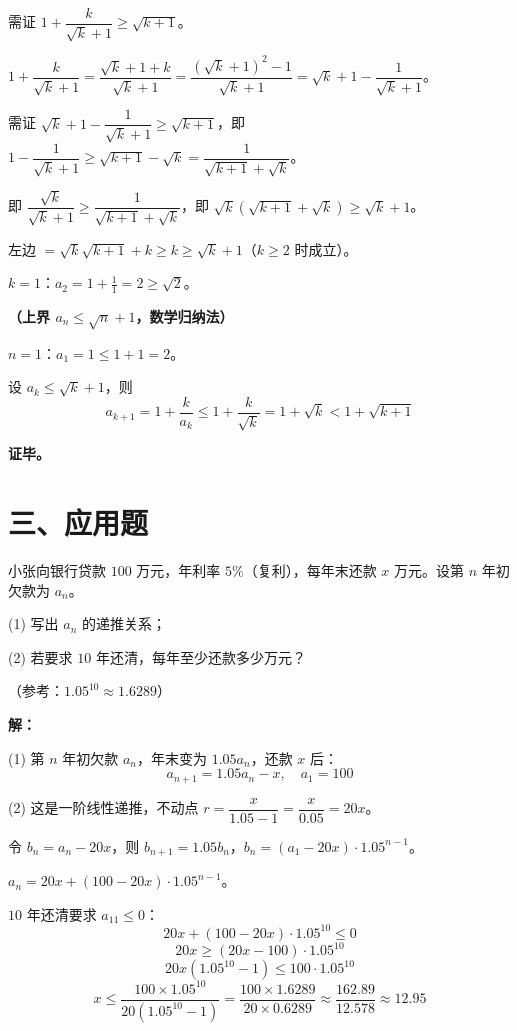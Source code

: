 \documentclass[12pt, a4paper]{ctexart}
\begin{document}
需证 $1 + \dfrac{k}{\sqrt{k}+1} \geq \sqrt{k+1}$。

$1 + \dfrac{k}{\sqrt{k}+1} = \dfrac{\sqrt{k}+1+k}{\sqrt{k}+1} = \dfrac{(\sqrt{k}+1)^2 - 1}{\sqrt{k}+1} = \sqrt{k}+1 - \dfrac{1}{\sqrt{k}+1}$。

需证 $\sqrt{k}+1 - \dfrac{1}{\sqrt{k}+1} \geq \sqrt{k+1}$，即 $1 - \dfrac{1}{\sqrt{k}+1} \geq \sqrt{k+1} - \sqrt{k} = \dfrac{1}{\sqrt{k+1}+\sqrt{k}}$。

即 $\dfrac{\sqrt{k}}{\sqrt{k}+1} \geq \dfrac{1}{\sqrt{k+1}+\sqrt{k}}$，即 $\sqrt{k}(\sqrt{k+1}+\sqrt{k}) \geq \sqrt{k}+1$。

左边 $= \sqrt{k}\sqrt{k+1} + k \geq k \geq \sqrt{k}+1$（$k\geq 2$ 时成立）。

$k=1$：$a_2 = 1+\frac{1}{1} = 2 \geq \sqrt{2}$。\;\checkmark

\textbf{（上界 $a_n \leq \sqrt{n}+1$，数学归纳法）}

$n=1$：$a_1 = 1 \leq 1+1 = 2$。\;\checkmark

设 $a_k \leq \sqrt{k}+1$，则
\[
a_{k+1} = 1 + \frac{k}{a_k} \leq 1 + \frac{k}{\sqrt{k}} = 1 + \sqrt{k} < 1 + \sqrt{k+1}
\]

\textbf{证毕。}

\section*{\textcolor{apppurple}{三、应用题}}

\begin{appbox}[【应用1】贷款还款问题]
小张向银行贷款 $100$ 万元，年利率 $5\%$（复利），每年末还款 $x$ 万元。设第 $n$ 年初欠款为 $a_n$。

(1) 写出 $a_n$ 的递推关系；

(2) 若要求 $10$ 年还清，每年至少还款多少万元？

（参考：$1.05^{10} \approx 1.6289$）
\end{appbox}

\textbf{解：}

(1) 第 $n$ 年初欠款 $a_n$，年末变为 $1.05a_n$，还款 $x$ 后：
\[
a_{n+1} = 1.05a_n - x,\quad a_1 = 100
\]

(2) 这是一阶线性递推，不动点 $r = \dfrac{x}{1.05-1} = \dfrac{x}{0.05} = 20x$。

令 $b_n = a_n - 20x$，则 $b_{n+1} = 1.05b_n$，$b_n = (a_1 - 20x)\cdot 1.05^{n-1}$。

$a_n = 20x + (100 - 20x)\cdot 1.05^{n-1}$。

$10$ 年还清要求 $a_{11} \leq 0$：
\[
20x + (100 - 20x)\cdot 1.05^{10} \leq 0
\]
\[
20x \geq (20x - 100)\cdot 1.05^{10}
\]
\[
20x(1.05^{10} - 1) \leq 100 \cdot 1.05^{10}
\]
\[
x \leq \frac{100 \times 1.05^{10}}{20(1.05^{10}-1)} = \frac{100\times 1.6289}{20\times 0.6289} \approx \frac{162.89}{12.578} \approx 12.95
\]
\end{document}
